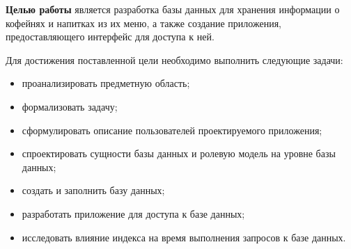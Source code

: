 
\textbf{Целью работы} является разработка базы данных для хранения информации о кофейнях и напитках из их меню, а также создание приложения, предоставляющего интерфейс для доступа к ней.


Для достижения поставленной цели необходимо выполнить следующие задачи:
\begin{itemize}
	\item проанализировать предметную область;
	\item формализовать задачу;
	\item сформулировать описание пользователей проектируемого приложения;
	\item спроектировать сущности базы данных и ролевую модель на уровне базы данных;
	\item создать и заполнить базу данных;
	\item разработать приложение для доступа к базе данных;
	\item исследовать влияние индекса на время выполнения запросов к базе данных.
\end{itemize}

\clearpage


